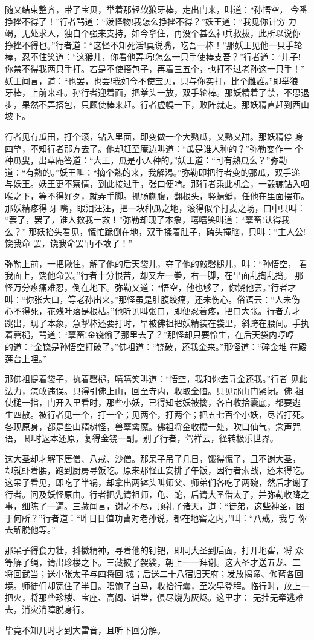 随又结束整齐，带了宝贝，举着那轻软狼牙棒，走出门来，叫道：“孙悟空，
今番挣挫不得了！”行者骂道：“泼怪物!我怎么挣挫不得？”妖王道：“我见你计穷
力竭，无处求人，独自个强来支持，如今拿住，再没个甚么神兵救拔，此所以说你
挣挫不得也。”行者道：“这怪不知死活!莫说嘴，吃吾一棒！”那妖王见他一只手轮
棒，忍不住笑道：“这猴儿，你看他弄巧!怎么一只手使棒支吾？”行者道：“儿子!
你禁不得我两只手打。若是不使搭包子，再着三五个，也打不过老孙这一只手！”
妖王闻言，道：“也罢，也罢!我如今不使宝贝，只与你实打，比个雌雄。”即举狼
牙棒，上前来斗。孙行者迎着面，把拳头一放，双手轮棒。那妖精着了禁，不思退
步，果然不弄搭包，只顾使棒来赶。行者虚幌一下，败阵就走。那妖精直赶到西山
坡下。

行者见有瓜田，打个滚，钻入里面，即变做一个大熟瓜，又熟又甜。那妖精停
身四望，不知行者那方去了。他却赶至庵边叫道：“瓜是谁人种的？”弥勒变作一
个种瓜叟，出草庵答道：“大王，瓜是小人种的。”妖王道：“可有熟瓜么？”弥勒
道：“有熟的。”妖王叫：“摘个熟的来，我解渴。”弥勒即把行者变的那瓜，双手递
与妖王。妖王更不察情，到此接过手，张口便啃。那行者乘此机会，一毂辘钻入咽
喉之下，等不得好歹，就弄手脚。抓肠蒯腹，翻根头，竖蜻蜓，任他在里面摆布。
那妖精疼得牙嘴，眼泪汪汪，把一块种瓜之地，滚得似个打麦之场，口中只叫：
“罢了，罢了，谁人救我一救！”弥勒却现了本象，嘻嘻笑叫道：“孽畜!认得我么？”
那妖抬头看见，慌忙跪倒在地，双手揉着肚子，磕头撞脑，只叫：“主人公!饶我命
罢，饶我命罢!再不敢了！”

弥勒上前，一把揪住，解了他的后天袋儿，夺了他的敲磬槌儿，叫：“孙悟空，
看我面上，饶他命罢。”行者十分恨苦，却又左一拳，右一脚，在里面乱掏乱捣。
那怪万分疼痛难忍，倒在地下。弥勒又道：“悟空，他也够了，你饶他罢。”行者才
叫：“你张大口，等老孙出来。”那怪虽是肚腹绞痛，还未伤心。俗语云：“人未伤
心不得死，花残叶落是根枯。”他听见叫张口，即便忍着疼，把口大张。行者方才
跳出，现了本象，急掣棒还要打时，早被佛祖把妖精装在袋里，斜跨在腰间。手执
着磬槌，骂道：“孽畜!金铙偷了那里去了？”那怪却只要怜生，在后天袋内哼哼
的道：“金铙是孙悟空打破了。”佛祖道：“铙破，还我金来。”那怪道：“碎金堆
在殿莲台上哩。”

那佛祖提着袋子，执着磬槌，嘻嘻笑叫道：“悟空，我和你去寻金还我。”行者
见此法力，怎敢违误。只得引佛上山，回至寺内，收取金碴。只见那山门紧闭。佛
祖使槌一指，门开入里看时，那些小妖，已得知老妖被擒，各自收拾囊底，都要逃
生四散。被行者见一个，打一个；见两个，打两个；把五七百个小妖，尽皆打死。
各现原身，都是些山精树怪，兽孽禽魔。佛祖将金收攒一处，吹口仙气，念声咒语，
即时返本还原，复得金铙一副。别了行者，驾祥云，径转极乐世界。

这大圣却才解下唐僧、八戒、沙僧。那呆子吊了几日，饿得慌了，且不谢大圣，
却就虾着腰，跑到厨房寻饭吃。原来那怪正安排了午饭，因行者索战，还未得吃。
这呆子看见，即吃了半锅，却拿出两钵头叫师父、师弟们各吃了两碗，然后才谢了
行者。问及妖怪原由。行者把先请祖师，龟、蛇，后请大圣借太子，并弥勒收降之
事，细陈了一遍。三藏闻言，谢之不尽，顶礼了诸天，道：“徒弟，这些神圣，困
于何所？”行者道：“昨日日值功曹对老孙说，都在地窖之内。”叫：“八戒，我与
你去解脱他等。”

那呆子得食力壮，抖擞精神，寻着他的钉钯，即同大圣到后面，打开地窖，将
众等解了绳，请出珍楼之下。三藏披了袈裟，朝上一一拜谢。这大圣才送五龙、二
将回武当；送小张太子与四将回城；后送二十八宿归天府；发放揭谛、伽蓝各回
境。师徒们却宽住了半日。喂饱了白马，收拾行囊，至次早登程。临行时，放上一
把火，将那些珍楼、宝座、高阁、讲堂，俱尽烧为灰烬。这里才：
无挂无牵逃难去，消灾消障脱身行。

毕竟不知几时才到大雷音，且听下回分解。